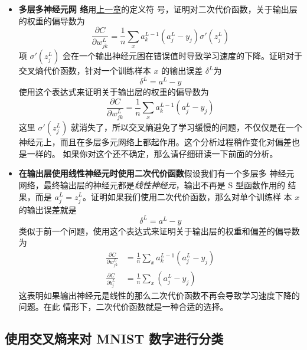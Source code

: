 \begin{itemize}
\item \textbf{多层多神经元网
    络}\quad 用\hyperref[ch:HowTheBackpropagationAlgorithmWorks]{上一章}的定义符
  号，证明对二次代价函数，关于输出层的权重的偏导数为
  \begin{equation}
    \frac{\partial C}{\partial w^L_{jk}} = \frac{1}{n}
    \sum_x a^{L-1}_k  (a^L_j-y_j) \sigma'(z^L_j)
    \label{eq:65}\tag{65}
  \end{equation}
  项 $\sigma'(z^L_j)$ 会在一个输出神经元困在错误值时导致学习速度的下降。证明对于
  交叉熵代价函数，针对一个训练样本 $x$ 的输出误差 $\delta^L$为
  \begin{equation}
    \delta^L = a^L-y
    \label{eq:66}\tag{66}
  \end{equation}
  使用这个表达式来证明关于输出层的权重的偏导数为
  \begin{equation}
    \frac{\partial C}{\partial w^L_{jk}} = \frac{1}{n} \sum_x
    a^{L-1}_k  (a^L_j-y_j)
    \label{eq:67}\tag{67}
  \end{equation}
  这里 $\sigma'(z^L_j)$ 就消失了，所以交叉熵避免了学习缓慢的问题，不仅仅是在一个
  神经元上，而且在多层多元网络上都起作用。这个分析过程稍作变化对偏差也是一样的。
  如果你对这个还不确定，那么请仔细研读一下前面的分析。
\item \textbf{在输出层使用线性神经元时使用二次代价函数}\quad 假设我们有一个多层多
  神经元网络，最终输出层的神经元都是\emph{线性神经元}，输出不再是 S 型函数作用的
  结果，而是 $a^L_j = z^L_j$。证明如果我们使用二次代价函数，那么对单个训练样
  本 $x$ 的输出误差就是
  \begin{equation}
    \delta^L = a^L-y
    \label{eq:68}\tag{68}
  \end{equation}
  类似于前一个问题，使用这个表达式来证明关于输出层的权重和偏差的偏导数为
  \begin{align}
    \frac{\partial C}{\partial w^L_{jk}} &= \frac{1}{n} \sum_x
                                           a^{L-1}_k  (a^L_j-y_j) \label{eq:69}\tag{69}\\
    \frac{\partial C}{\partial b^L_{j}} &= \frac{1}{n} \sum_x
                                          (a^L_j-y_j) \label{eq:70}\tag{70}
  \end{align}
  这表明如果输出神经元是线性的那么二次代价函数不再会导致学习速度下降的问题。在此
  情形下，二次代价函数就是一种合适的选择。
\end{itemize}

\subsection{使用交叉熵来对 MNIST 数字进行分类}

